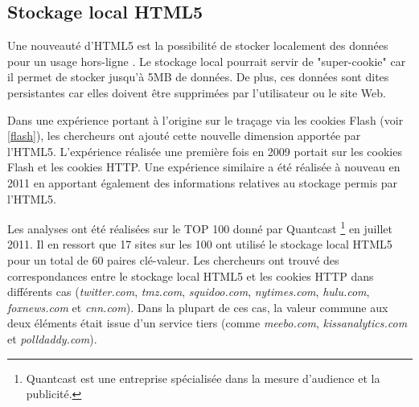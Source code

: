 
\subsection{Stockage local HTML5}
\label{cache_html5}
Une nouveauté d'HTML5 est la possibilité de stocker localement des données pour un usage hors-ligne \cite{West:2012:APS:2038772.2038791}.
Le stockage local pourrait servir de "super-cookie" car il permet de stocker jusqu'à 5MB de données. De plus, ces données sont dites persistantes car elles doivent être supprimées par l'utilisateur ou le site Web.
\newline

Dans une expérience portant à l'origine sur le traçage via les cookies Flash \cite{flash_cookies_privacy_2} (voir \autoref{flash}), les chercheurs ont ajouté cette nouvelle dimension apportée par l'HTML5.
L'expérience réalisée une première fois en 2009 portait sur les cookies Flash et les cookies HTTP. Une expérience similaire a été réalisée à nouveau en 2011 en apportant également des informations relatives au stockage permis par l'HTML5.
\newline

Les analyses ont été réalisées sur le TOP 100 donné par Quantcast \footnote{Quantcast est une entreprise spécialisée dans la mesure d'audience et la publicité.} en juillet 2011.
Il en ressort que 17 sites sur les 100 ont utilisé le stockage local HTML5 pour un total de 60 paires clé-valeur. Les chercheurs ont trouvé des correspondances entre le stockage local HTML5 et les cookies HTTP dans différents cas (\textit{twitter.com}, \textit{tmz.com}, \textit{squidoo.com}, \textit{nytimes.com}, \textit{hulu.com}, \textit{foxnews.com} et \textit{cnn.com}). Dans la plupart de ces cas, la valeur commune aux deux éléments était issue d'un service tiers (comme \textit{meebo.com}, \textit{kissanalytics.com} et \textit{polldaddy.com}).

